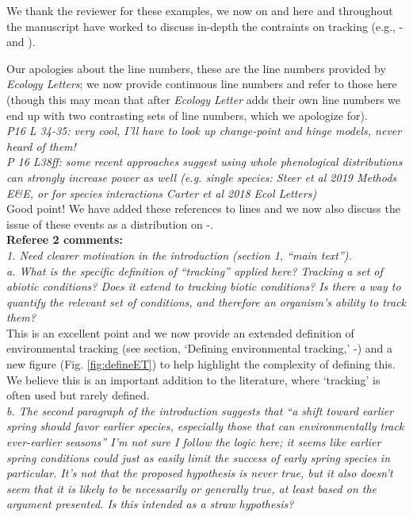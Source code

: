 \documentclass[11pt]{article}
\begin{document}
We thank the reviewer for these examples, we now \citet{yang2020} on  and here and throughout the manuscript have worked to discuss in-depth the contraints on tracking (e.g., - and ). 

Our apologies about the line numbers, these are the line numbers provided by \emph{Ecology Letters}; we now provide continuous line numbers and refer to those here (though this may mean that after \emph{Ecology Letter} adds their own line numbers we end up with two contrasting sets of line numbers, which we apologize for).\\

\emph{P16 L 34-35: very cool, I'll have to look up change-point and hinge models, never heard of
them!}\\

\emph{P 16 L38ff: some recent approaches suggest using whole phenological distributions can
strongly increase power as well (e.g. single species: Steer et al 2019 Methods E\&E, or for
species interactions Carter et al 2018 Ecol Letters)}\\

Good point! We have added these references to lines  and we now also discuss the issue of these events as a distribution on -. \\

{\bf Referee 2 comments:} \\


\emph{1.      Need clearer motivation in the introduction (section 1, ``main text'').\\
a.      What is the specific definition of “tracking” applied here? Tracking a set of abiotic
conditions? Does it extend to tracking biotic conditions? Is there a way to quantify the
relevant set of conditions, and therefore an organism's ability to track them?}\\

This is an excellent point and we now provide an extended definition of environmental tracking (see section, `Defining environmental tracking,' -) and a new figure (Fig. \ref{fig:defineET}) to help highlight the complexity of defining this. We believe this is an important addition to the literature, where `tracking' is often used but rarely defined. \\
 
\emph{b.      The second paragraph of the introduction suggests that ``a shift toward earlier spring
should favor earlier species, especially those that can environmentally track ever-earlier
seasons'' I'm not sure I follow the logic here; it seems like earlier spring conditions could
just as easily limit the success of early spring species in particular. It's not that the
proposed hypothesis is never true, but it also doesn't seem that it is likely to be
necessarily or generally true, at least based on the argument presented. Is this intended as
a straw hypothesis?}\\
\end{document}
